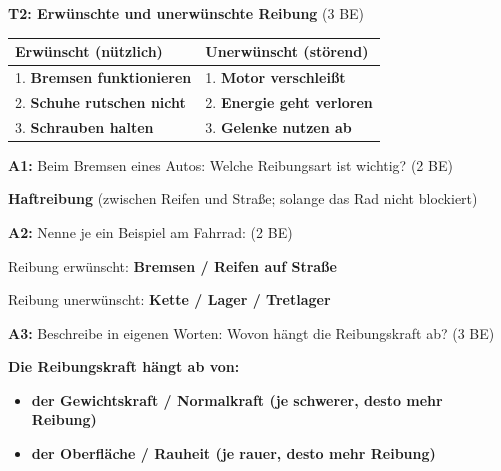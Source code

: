 \documentclass[a4paper,11pt]{article}
\newcommand{\stern}[1]{\textcolor{warning}{\textbf{#1}}}
\newcommand{\lsg}[1]{\textcolor{loesung}{\textbf{#1}}}
\begin{document}
\vspace{3mm}


\textbf{T2: Erwünschte und unerwünschte Reibung} \hfill (3 BE)

\begin{center}
\begin{tabular}{|p{6.5cm}|p{6.5cm}|}
\hline
\rowcolor{white}
\textbf{Erwünscht (nützlich)} & \textbf{Unerwünscht (störend)} \\
\hline
1. \lsg{Bremsen funktionieren} & 1. \lsg{Motor verschleißt} \\[3mm]
2. \lsg{Schuhe rutschen nicht} & 2. \lsg{Energie geht verloren} \\[3mm]
3. \lsg{Schrauben halten} & 3. \lsg{Gelenke nutzen ab} \\
\hline
\end{tabular}
\end{center}

\vspace{5mm}


\begin{tcolorbox}[colback=white, colframe=warning, boxrule=1pt, arc=0pt,
    title={\textbf{Aufgaben \stern{*}}}, fonttitle=\normalsize, coltitle=black, colbacktitle=white]

\textbf{A1:} Beim Bremsen eines Autos: Welche Reibungsart ist wichtig? \hfill (2 BE)

\lsg{Haftreibung} (zwischen Reifen und Straße; solange das Rad nicht blockiert)

\vspace{2mm}

\textbf{A2:} Nenne je ein Beispiel am Fahrrad: \hfill (2 BE)

Reibung erwünscht: \lsg{Bremsen / Reifen auf Straße}

Reibung unerwünscht: \lsg{Kette / Lager / Tretlager}

\end{tcolorbox}

\vspace{5mm}


\begin{tcolorbox}[colback=white, colframe=warning, boxrule=1pt, arc=0pt,
    title={\textbf{Aufgaben \stern{**}}}, fonttitle=\normalsize, coltitle=black, colbacktitle=white]

\textbf{A3:} Beschreibe in eigenen Worten: Wovon hängt die Reibungskraft ab? \hfill (3 BE)

\lsg{Die Reibungskraft hängt ab von:}
\begin{itemize}
    \item \lsg{der Gewichtskraft / Normalkraft (je schwerer, desto mehr Reibung)}
    \item \lsg{der Oberfläche / Rauheit (je rauer, desto mehr Reibung)}
\end{itemize}

\end{tcolorbox}
\end{document}
